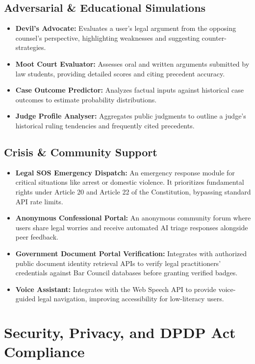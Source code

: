 \documentclass[conference]{IEEEtran}
\begin{document}
\subsection{Adversarial \& Educational Simulations}
\begin{itemize}[leftmargin=*]
  \item \textbf{Devil's Advocate:} Evaluates a user's legal argument from the opposing counsel's perspective, highlighting weaknesses and suggesting counter-strategies.
  \item \textbf{Moot Court Evaluator:} Assesses oral and written arguments submitted by law students, providing detailed scores and citing precedent accuracy.
  \item \textbf{Case Outcome Predictor:} Analyzes factual inputs against historical case outcomes to estimate probability distributions.
  \item \textbf{Judge Profile Analyser:} Aggregates public judgments to outline a judge's historical ruling tendencies and frequently cited precedents.
\end{itemize}

\subsection{Crisis \& Community Support}
\begin{itemize}[leftmargin=*]
  \item \textbf{Legal SOS Emergency Dispatch:} An emergency response module for critical situations like arrest or domestic violence. It prioritizes fundamental rights under Article 20 and Article 22 of the Constitution, bypassing standard API rate limits.
  \item \textbf{Anonymous Confessional Portal:} An anonymous community forum where users share legal worries and receive automated AI triage responses alongside peer feedback.
  \item \textbf{Government Document Portal Verification:} Integrates with authorized public document identity retrieval APIs to verify legal practitioners' credentials against Bar Council databases before granting verified badges.
  \item \textbf{Voice Assistant:} Integrates with the Web Speech API to provide voice-guided legal navigation, improving accessibility for low-literacy users.
\end{itemize}

\section{Security, Privacy, and DPDP Act Compliance}
\label{sec:security}
\end{document}
